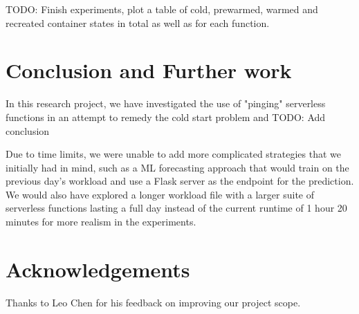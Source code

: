 \documentclass{article}
\begin{document}
TODO: Finish experiments, plot a table of cold, prewarmed, warmed and recreated container states in total as well as for each function.

\section{Conclusion and Further work}

In this research project, we have investigated the use of "pinging" serverless functions in an attempt to remedy the cold start problem and TODO: Add conclusion

Due to time limits, we were unable to add more complicated strategies that we initially had in mind, such as a ML forecasting approach that would train on the previous day's workload and use a Flask server as the endpoint for the prediction. We would also have explored a longer workload file with a larger suite of serverless functions lasting a full day instead of the current runtime of 1 hour 20 minutes for more realism in the experiments.

\section{Acknowledgements}

Thanks to Leo Chen for his feedback on improving our project scope.



\end{document}
